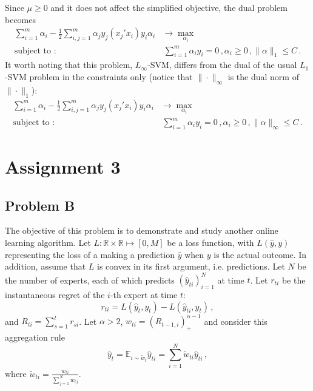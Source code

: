 \documentclass[a4paper]{article}
\newcommand{\Real}{\mathbb{R}}
\newcommand{\ex}{\mathbb{E}}
\begin{document}
Since $\mu \geq 0$ and it does not affect the simplified objective, the dual problem
becomes
\begin{align*}
  \sum_{i=1}^m \alpha_i - \frac{1}{2}
        \sum_{i,j=1}^m \alpha_j y_j (x_j'x_i) y_i \alpha_i
    &\to \max_{\alpha_i} \\
  \text{subject to :}\,
      &\,\sum_{i=1}^m \alpha_i y_i = 0
      \,,\alpha_i \geq 0
      \,,\|\alpha\|_1 \leq C \,.
\end{align*}
It worth noting that this problem, $L_\infty$-SVM, differs from the dual of the usual
$L_1$-SVM problem in the constraints only (notice that $\|\cdot\|_\infty$ is the dual
norm of $\|\cdot\|_1$):
\begin{align*}
  \sum_{i=1}^m \alpha_i - \frac{1}{2}
        \sum_{i,j=1}^m \alpha_j y_j (x_j'x_i) y_i \alpha_i
    &\to \max_{\alpha_i} \\
  \text{subject to :}\,
      &\,\sum_{i=1}^m \alpha_i y_i = 0
       \,,\alpha_i \geq 0
       \,,\|\alpha\|_\infty \leq C \,.
\end{align*}




\section{Assignment 3} %
\label{sec:assignment_3}

\subsection{Problem B} %
\label{sub:problem_3b}

The objective of this problem is to demonstrate and study another online learning
algorithm. Let $L:\Real\times \Real\mapsto [0, M]$ be a loss function, with $L(\hat{y}, y)$
representing the loss of a making a prediction $\hat{y}$ when $y$ is the actual
outcome. In addition, assume that $L$ is convex in its first argument, i.e. predictions.
Let $N$ be the number of experts, each of which predicts $(\hat{y}_{ti})_{i=1}^N$
at time $t$. Let $r_{ti}$ be the instantaneous regret of the $i$-th expert at time
$t$:
\begin{equation*}
  r_{ti} = L(\hat{y}_t, y_t) - L(\hat{y}_{ti}, y_t)\,,
\end{equation*}
and $R_{ti} = \sum_{s=1}^t r_{si}$. Let $\alpha > 2$, $w_{ti} = (R_{t-1,i})_+^{\alpha-1}$
and consider this aggregation rule
\begin{equation*}
  \hat{y}_t
    = \ex_{i\sim \tilde{w}_t} \hat{y}_{ti}
    = \sum_{i=1}^N \tilde{w}_{ti} \hat{y}_{ti} \,,
\end{equation*}
where $\tilde{w}_{ti} = \frac{w_{ti}}{\sum_{j=1}^N w_{tj}}$.
\end{document}
